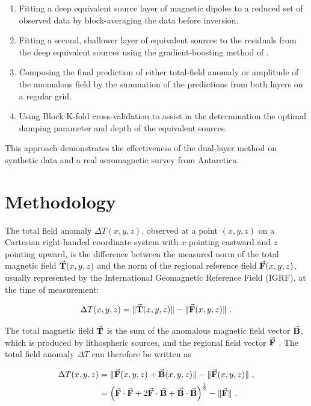 \begin{enumerate}
  \item Fitting a deep equivalent source layer of magnetic dipoles to a reduced set of observed data by block-averaging the data before inversion.
  \item Fitting a second, shallower layer of equivalent sources to the residuals from the deep equivalent sources using the gradient-boosting method of \citet{Soler2021}.
  \item Composing the final prediction of either total-field anomaly or amplitude of the anomalous field by the summation of the predictions from both layers on a regular grid.
  \item Using Block K-fold cross-validation to assist in the determination the optimal damping parameter and depth of the equivalent sources.
\end{enumerate}

\noindent
This approach demonstrates the effectiveness of the dual-layer method on synthetic data and a real aeromagnetic survey from Antarctica.


\section{Methodology}

The total field anomaly $\Delta T(x, y, z)$, observed at a point $(x, y, z)$ on a Cartesian right-handed coordinate system with $x$ pointing eastward and $z$ pointing upward, is the difference between the measured norm of the total magnetic field $\vec{\mathbf{T}}(x, y, z)$ and the norm of the regional reference field $\vec{\mathbf{F}}(x, y, z)$, usually represented by the International Geomagnetic Reference Field (IGRF), at the time of measurement:

\begin{equation}
    \Delta T(x, y, z) =
    \lVert \vec{\mathbf{T}}(x, y, z) \rVert
    - \lVert \vec{\mathbf{F}}(x, y, z) \rVert
    \ .
\end{equation}

\noindent
The total magnetic field $\vec{\mathbf{T}}$ is the sum of the anomalous magnetic field vector $\vec{\mathbf{B}}$, which is produced by lithospheric sources, and the regional field vector $\vec{\mathbf{F}}$ \citep{Blakley1995, Langel1998, OliveiraJr2015}. The total field anomaly $\Delta T$ can therefore be written as

\begin{align}
    \label{eq:tfa-definition}
    \Delta T(x, y, z) &=
    \lVert \vec{\mathbf{F}}(x, y, z) + \vec{\mathbf{B}}(x, y, z) \rVert - \lVert \vec{\mathbf{F}}(x, y, z) \rVert\ ,
    \\
    &= \left(
        \vec{\mathbf{F}} \cdot \vec{\mathbf{F}} 
        + 2\vec{\mathbf{F}} \cdot \vec{\mathbf{B}} 
        + \vec{\mathbf{B}} \cdot \vec{\mathbf{B}}
        \right)^{\frac{1}{2}} 
    - \lVert \vec{\mathbf{F}} \rVert
    \ .
\end{align}


